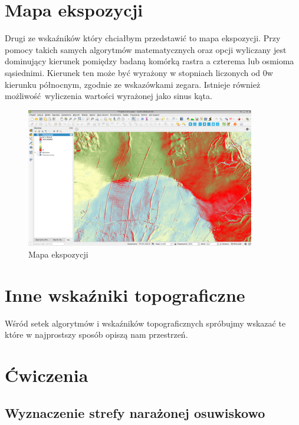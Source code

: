 \documentclass[a4paper,11pt, onecolumn, openany]{memoir}
\begin{document}
		\section{Mapa ekspozycji}
		Drugi ze wskaźników który chciałbym przedstawić to mapa ekspozycji. Przy pomocy takich samych algorytmów matematycznych oraz opcji wyliczany jest dominujący kierunek pomiędzy badaną komórką rastra a czterema lub osmioma sąsiednimi. Kierunek ten może być wyrażony w stopniach liczonych od 0\degree w kierunku północnym, zgodnie ze wskazówkami zegara. Istnieje również możliwość wyliczenia wartości wyrażonej jako sinus kąta.
		\begin{figure}[!ht]
			\centering
			\includegraphics[width=10cm]{nmt-ekspozycja}
			\caption{Mapa ekspozycji}
		\end{figure}
		\section{Inne wskaźniki topograficzne}
		Wśród setek algorytmów i wskaźników topograficznych spróbujmy wskazać te które w najprostszy sposób opiszą nam przestrzeń.
		\section{Ćwiczenia}
			\subsection{Wyznaczenie strefy narażonej osuwiskowo}
\end{document}
